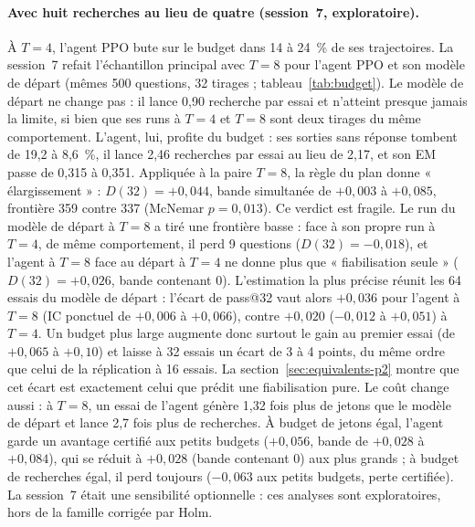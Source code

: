 \documentclass[11pt,a4paper]{article}
\begin{document}
\paragraph{Avec huit recherches au lieu de quatre (session~7, exploratoire).} À $T = 4$, l'agent PPO bute sur le budget dans 14 à 24~\% de ses trajectoires. La session~7 refait l'échantillon principal avec $T = 8$ pour l'agent PPO et son modèle de départ (mêmes 500 questions, 32 tirages ; tableau~\ref{tab:budget}). Le modèle de départ ne change pas : il lance 0,90 recherche par essai et n'atteint presque jamais la limite, si bien que ses runs à $T = 4$ et $T = 8$ sont deux tirages du même comportement. L'agent, lui, profite du budget : ses sorties sans réponse tombent de 19,2 à 8,6~\%, il lance 2,46 recherches par essai au lieu de 2,17, et son EM passe de 0,315 à 0,351. Appliquée à la paire $T = 8$, la règle du plan donne « élargissement » : $D(32) = +0{,}044$, bande simultanée de $+0{,}003$ à $+0{,}085$, frontière 359 contre 337 (McNemar $p = 0{,}013$). Ce verdict est fragile. Le run du modèle de départ à $T = 8$ a tiré une frontière basse : face à son propre run à $T = 4$, de même comportement, il perd 9 questions ($D(32) = -0{,}018$), et l'agent à $T = 8$ face au départ à $T = 4$ ne donne plus que « fiabilisation seule » ($D(32) = +0{,}026$, bande contenant 0). L'estimation la plus précise réunit les 64 essais du modèle de départ : l'écart de pass@32 vaut alors $+0{,}036$ pour l'agent à $T = 8$ (IC ponctuel de $+0{,}006$ à $+0{,}066$), contre $+0{,}020$ ($-0{,}012$ à $+0{,}051$) à $T = 4$. Un budget plus large augmente donc surtout le gain au premier essai (de $+0{,}065$ à $+0{,}10$) et laisse à 32 essais un écart de 3 à 4 points, du même ordre que celui de la réplication à 16 essais. La section~\ref{sec:equivalents-p2} montre que cet écart est exactement celui que prédit une fiabilisation pure. Le coût change aussi : à $T = 8$, un essai de l'agent génère 1,32 fois plus de jetons que le modèle de départ et lance 2,7 fois plus de recherches. À budget de jetons égal, l'agent garde un avantage certifié aux petits budgets ($+0{,}056$, bande de $+0{,}028$ à $+0{,}084$), qui se réduit à $+0{,}028$ (bande contenant 0) aux plus grands ; à budget de recherches égal, il perd toujours ($-0{,}063$ aux petits budgets, perte certifiée). La session~7 était une sensibilité optionnelle : ces analyses sont exploratoires, hors de la famille corrigée par Holm.
\end{document}
